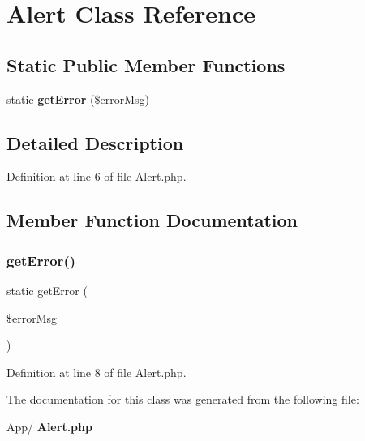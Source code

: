 \section{Alert Class Reference}
\label{class_app_1_1_alert}
\subsection*{Static Public Member Functions}
\begin{DoxyCompactItemize}
\item 
static \textbf{ get\+Error} (\$error\+Msg)
\end{DoxyCompactItemize}


\subsection{Detailed Description}


Definition at line 6 of file Alert.\+php.



\subsection{Member Function Documentation}
\mbox{\label{class_app_1_1_alert_a9e9e1b0e1f542b18ea01e9f132a278e2}} 
\subsubsection{get\+Error()}
{\footnotesize\ttfamily static get\+Error (\begin{DoxyParamCaption}\item[{}]{\$error\+Msg }\end{DoxyParamCaption})\hspace{0.3cm}{\ttfamily [static]}}



Definition at line 8 of file Alert.\+php.



The documentation for this class was generated from the following file\+:\begin{DoxyCompactItemize}
\item 
App/\textbf{ Alert.\+php}\end{DoxyCompactItemize}
